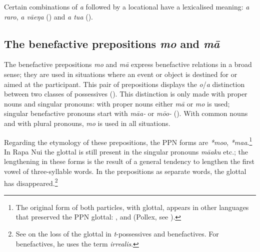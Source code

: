 Certain combinations of \textit{a} followed by a locational have a lexicalised meaning: \textit{a raro}, \textit{a vāeŋa} () and \textit{a tu{\ꞌ}a} ().
\subsection{The benefactive prepositions \textit{mo} and \textit{mā}}\label{sec:4.7.7}
The benefactive prepositions \textit{mo} and \textit{mā} express benefactive relations in a broad sense; they are used in situations where an event or object is destined for or aimed at the participant. This pair of prepositions displays the \textit{o}/\textit{a} distinction between two classes of possessives (). This distinction is only made with proper nouns and singular pronouns: with proper nouns either \textit{mā} or \textit{mo} is used; singular benefactive pronouns start with \textit{mā{\ꞌ}a-} or \textit{mō{\ꞌ}o-} (). With common nouns and with plural pronouns, \textit{mo} is used in all situations. 

Regarding the etymology of these prepositions, the PPN forms are \textit{*mo{\ꞌ}o}, \mbox{\textit{*ma{\ꞌ}a}}.\footnote{\label{fn:233}The original form of both particles, with glottal, appears in other languages that preserved the PPN glottal: ,  and  (Pollex, see \citealt{GreenhillClark2011}).} In Rapa Nui the glottal is still present in the singular pronouns \textit{mā{\ꞌ}aku} etc.; the lengthening in these forms is the result of a general tendency to lengthen the first vowel of three-syllable words. In the prepositions as separate words, the glottal has disappeared.\footnote{\label{fn:234}See \citet{Wilson1985} on the loss of the glottal in \textit{t}{}-possessives and benefactives. For benefactives, he uses the term \textit{irrealis}.}

